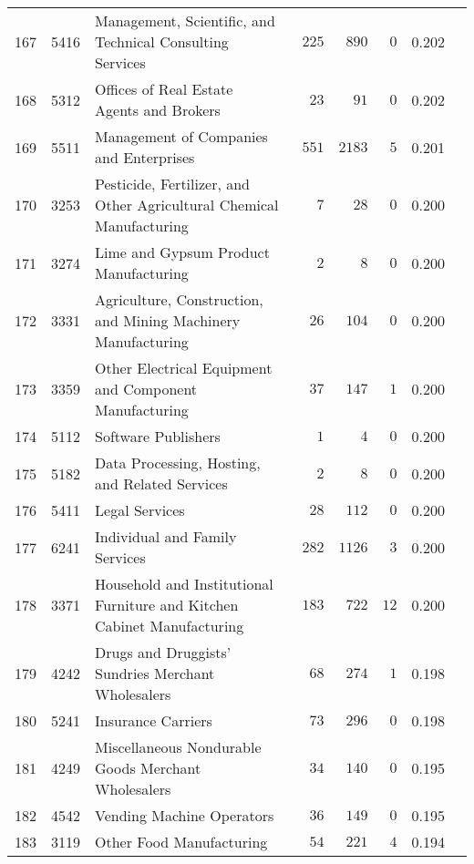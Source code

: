 \documentclass[9pt, oneside]{article}   	%
\begin{document}
\begin{longtable}{lcp{3 in}ccccc}
167  & 5416 & Management, Scientific, and Technical Consulting Services & $\phantom{0}225$ & $\phantom{0}890$ & $\phantom{0}0$ & 0.202 \\
168  & 5312 & Offices of Real Estate Agents and Brokers & $\phantom{00}23$ & $\phantom{00}91$ & $\phantom{0}0$ & 0.202 \\
169  & 5511 & Management of Companies and Enterprises & $\phantom{0}551$ & $2183$ & $\phantom{0}5$ & 0.201 \\
170  & 3253 & Pesticide, Fertilizer, and Other Agricultural Chemical Manufacturing & $\phantom{000}7$ & $\phantom{00}28$ & $\phantom{0}0$ & 0.200 \\
171  & 3274 & Lime and Gypsum Product Manufacturing & $\phantom{000}2$ & $\phantom{000}8$ & $\phantom{0}0$ & 0.200 \\
172  & 3331 & Agriculture, Construction, and Mining Machinery Manufacturing & $\phantom{00}26$ & $\phantom{0}104$ & $\phantom{0}0$ & 0.200 \\
173  & 3359 & Other Electrical Equipment and Component Manufacturing & $\phantom{00}37$ & $\phantom{0}147$ & $\phantom{0}1$ & 0.200 \\
174  & 5112 & Software Publishers & $\phantom{000}1$ & $\phantom{000}4$ & $\phantom{0}0$ & 0.200 \\
175  & 5182 & Data Processing, Hosting, and Related Services & $\phantom{000}2$ & $\phantom{000}8$ & $\phantom{0}0$ & 0.200 \\
176  & 5411 & Legal Services & $\phantom{00}28$ & $\phantom{0}112$ & $\phantom{0}0$ & 0.200 \\
177  & 6241 & Individual and Family Services & $\phantom{0}282$ & $1126$ & $\phantom{0}3$ & 0.200 \\
178  & 3371 & Household and Institutional Furniture and Kitchen Cabinet Manufacturing & $\phantom{0}183$ & $\phantom{0}722$ & $12$ & 0.200 \\
179  & 4242 & Drugs and Druggists' Sundries Merchant Wholesalers & $\phantom{00}68$ & $\phantom{0}274$ & $\phantom{0}1$ & 0.198 \\
180  & 5241 & Insurance Carriers & $\phantom{00}73$ & $\phantom{0}296$ & $\phantom{0}0$ & 0.198 \\
181  & 4249 & Miscellaneous Nondurable Goods Merchant Wholesalers & $\phantom{00}34$ & $\phantom{0}140$ & $\phantom{0}0$ & 0.195 \\
182  & 4542 & Vending Machine Operators & $\phantom{00}36$ & $\phantom{0}149$ & $\phantom{0}0$ & 0.195 \\
183  & 3119 & Other Food Manufacturing & $\phantom{00}54$ & $\phantom{0}221$ & $\phantom{0}4$ & 0.194 \\

\end{longtable}
\end{document}
